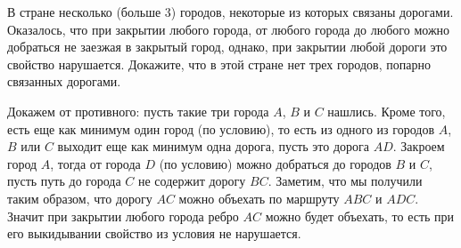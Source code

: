 В стране несколько (больше 3) городов, некоторые из которых связаны дорогами.
Оказалось, что при закрытии любого города, от любого города до любого можно
добраться не заезжая в закрытый город, однако, при закрытии любой дороги это
свойство нарушается.
Докажите, что в этой стране нет трех городов, попарно связанных дорогами.

\solution
Докажем от противного: пусть такие три города $A$, $B$ и $C$ нашлись.
Кроме того, есть еще как минимум один город (по условию), то есть из одного из
городов $A$, $B$ или $C$ выходит еще как минимум одна дорога, пусть это дорога
$AD$.
Закроем город $A$, тогда от города $D$ (по условию) можно добраться до городов
$B$ и $C$, пусть путь до города $C$ не содержит дорогу $BC$.
Заметим, что мы получили таким образом, что дорогу $AC$ можно объехать по
маршруту $ABC$ и $ADC$.
Значит при закрытии любого города ребро $AC$ можно будет объехать, то есть при
его выкидывании свойство из условия не нарушается.

